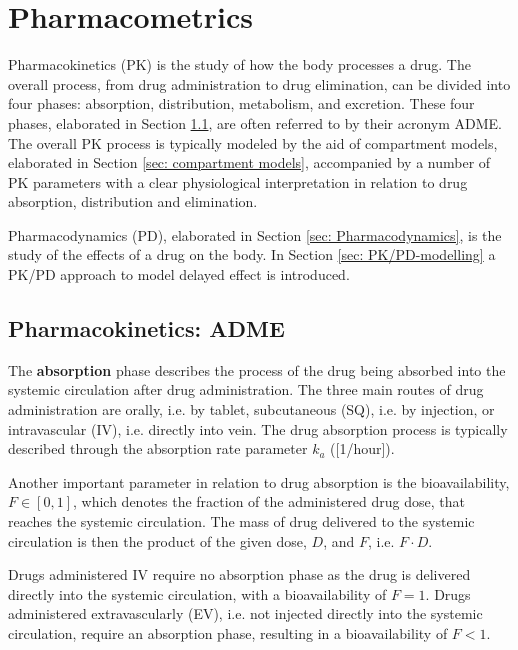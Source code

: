 \chapter{Pharmacometrics}

Pharmacokinetics (PK) is the study of how the body processes a drug. The overall process, from drug administration to drug elimination, can be divided into four phases: absorption, distribution, metabolism, and excretion. These four phases, elaborated in Section \ref{Sec: ADME and PK-parameters}, are often referred to by their acronym ADME. The overall PK process is typically modeled by the aid of compartment models, elaborated in Section \ref{sec: compartment models}, accompanied by a number of PK parameters with a clear physiological interpretation in relation to drug absorption, distribution and elimination. 

Pharmacodynamics (PD), elaborated in Section \ref{sec: Pharmacodynamics}, is the study of the effects of a drug on the body.  In Section \ref{sec: PK/PD-modelling} a PK/PD approach to model delayed effect is introduced.

\section{Pharmacokinetics: ADME} \label{Sec: ADME and PK-parameters}

The \textbf{absorption} phase describes the process of the drug being absorbed into the systemic circulation after drug administration. The three main routes of drug administration are orally, i.e. by tablet, subcutaneous (SQ), i.e. by injection, or intravascular (IV), i.e. directly into vein. The drug absorption process is typically described through the absorption rate parameter $k_a$ ([1/hour]).

Another important parameter in relation to drug absorption is the bioavailability, $F \in [0,1]$, which denotes the fraction of the administered drug dose, that reaches the systemic circulation. The mass of drug delivered to the systemic circulation is then the product of the given dose, $D$, and $F$, i.e. $F \cdot D$.

Drugs administered IV require no absorption phase as the drug is delivered directly into the systemic circulation, with a bioavailability of $F=1$. Drugs administered extravascularly (EV), i.e. not injected directly into the systemic circulation, require an absorption phase, resulting in a bioavailability of $F <1$.

